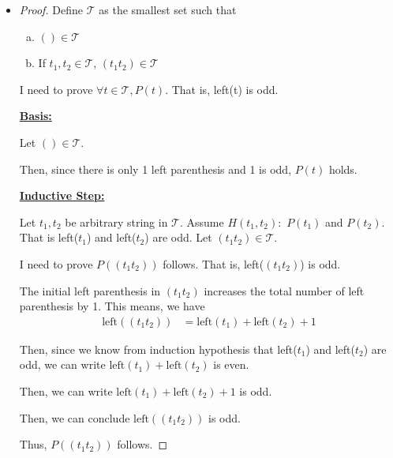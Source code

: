 \documentclass[12pt]{article}
\begin{document}
\begin{itemize}
    \item

    \begin{proof}
    Define $\mathcal{T}$ as the smallest set such that

    \begin{enumerate}[a.]
        \item $() \in \mathcal{T}$
        \item If $t_1,t_2 \in \mathcal{T}$, $(t_1t_2) \in \mathcal{T}$
    \end{enumerate}

    \bigskip

    I need to prove $\forall t \in \mathcal{T}, P(t)$. That is,
    left(t) is odd.

    \bigskip

    \underline{\textbf{Basis:}}

    \bigskip

    Let $() \in \mathcal{T}$.

    \bigskip

    Then, since there is only 1 left parenthesis and 1 is odd,
    $P(t)$ holds.

    \bigskip

    \underline{\textbf{Inductive Step:}}

    \bigskip

    Let $t_1,t_2$ be arbitrary string in $\mathcal{T}$. Assume
    $H(t_1,t_2):$ $P(t_1)$ and $P(t_2)$. That is left($t_1$) and left($t_2$)
    are odd. Let $(t_1t_2) \in \mathcal{T}$.

    \bigskip

    I need to prove $P((t_1t_2))$ follows. That is, left($(t_1t_2)$) is odd.

    \bigskip

    The initial left parenthesis in $(t_1t_2)$ increases the total number of left
    parenthesis by 1. This means, we have
    \setcounter{equation}{0}
    \begin{align}
        \text{left}((t_1t_2)) &= \text{left}(t_1) + \text{left}(t_2) + 1
    \end{align}

    \bigskip

    Then, since we know from induction hypothesis that left($t_1$) and left($t_2$)
    are odd, we can write $\text{left}(t_1) + \text{left}(t_2)$ is even.

    \bigskip

    Then, we can write $\text{left}(t_1) + \text{left}(t_2) + 1$ is odd.

    \bigskip

    Then, we can conclude $\text{left}((t_1t_2))$ is odd.

    \bigskip

    Thus, $P((t_1t_2))$ follows.

    \end{proof}
\end{itemize}
\end{document}
